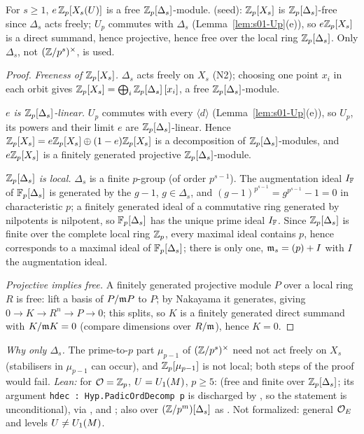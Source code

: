 \begin{proposition}\label{prop:s04-freeA}
For $s\ge1$, $e\,\mathbb{Z}_p[X_s(U)]$ is a free $\mathbb{Z}_p[\Delta_s]$-module. \stproved{} (seed): $\mathbb{Z}_p[X_s]$ is $\mathbb{Z}_p[\Delta_s]$-free since
$\Delta_s$ acts freely; $U_p$ commutes with $\Delta_s$ (Lemma~\ref{lem:s01-Up}(e)), so $e\mathbb{Z}_p[X_s]$ is a direct summand, hence
projective, hence free over the local ring $\mathbb{Z}_p[\Delta_s]$. Only $\Delta_s$, not $(\mathbb{Z}/p^s)^\times$, is used.
\end{proposition}
\begin{proof}
\emph{Freeness of $\mathbb{Z}_p[X_s]$.} $\Delta_s$ acts freely on $X_s$ (N2); choosing one point $x_i$ in each orbit gives
$\mathbb{Z}_p[X_s]=\bigoplus_i\mathbb{Z}_p[\Delta_s]\,[x_i]$, a free $\mathbb{Z}_p[\Delta_s]$-module.

\emph{$e$ is $\mathbb{Z}_p[\Delta_s]$-linear.} $U_p$ commutes with every $\langle d\rangle$ (Lemma~\ref{lem:s01-Up}(e)), so $U_p$, its powers
and their limit $e$ are $\mathbb{Z}_p[\Delta_s]$-linear. Hence $\mathbb{Z}_p[X_s]=e\mathbb{Z}_p[X_s]\oplus(1-e)\mathbb{Z}_p[X_s]$ is a decomposition of
$\mathbb{Z}_p[\Delta_s]$-modules, and $e\mathbb{Z}_p[X_s]$ is a finitely generated projective $\mathbb{Z}_p[\Delta_s]$-module.

\emph{$\mathbb{Z}_p[\Delta_s]$ is local.} $\Delta_s$ is a finite $p$-group (of order $p^{s-1}$). The augmentation ideal $I_{\mathbb{F}}$ of $\mathbb{F}_p[\Delta_s]$
is generated by the $g-1$, $g\in\Delta_s$, and $(g-1)^{p^{s-1}}=g^{p^{s-1}}-1=0$ in characteristic $p$; a finitely generated ideal of a
commutative ring generated by nilpotents is nilpotent, so $\mathbb{F}_p[\Delta_s]$ has the unique prime ideal $I_{\mathbb{F}}$. Since $\mathbb{Z}_p[\Delta_s]$
is finite over the complete local ring $\mathbb{Z}_p$, every maximal ideal contains $p$, hence corresponds to a maximal ideal of
$\mathbb{F}_p[\Delta_s]$; there is only one, $\mathfrak{m}_s=(p)+I$ with $I$ the augmentation ideal.

\emph{Projective implies free.} A finitely generated projective module $P$ over a local ring $R$ is free: lift a basis of
$P/\mathfrak{m} P$ to $P$; by Nakayama it generates, giving $0\to K\to R^n\to P\to0$; this splits, so $K$ is a finitely generated direct summand
with $K/\mathfrak{m} K=0$ (compare dimensions over $R/\mathfrak{m}$), hence $K=0$.
\end{proof}
\noindent\emph{Why only $\Delta_s$.} The prime-to-$p$ part $\mu_{p-1}$ of $(\mathbb{Z}/p^s)^\times$ need not act freely on $X_s$ (stabilisers in
$\mu_{p-1}$ can occur), and $\mathbb{Z}_p[\mu_{p-1}]$ is not local; both steps of the proof would fail.
\emph{Lean:} \stformal{} for $\mathcal{O}=\mathbb{Z}_p$, $U=U_1(M)$, $p\ge5$:  (free and finite over $\mathbb{Z}_p[\Delta_s]$; its argument
\texttt{hdec : Hyp.PadicOrdDecomp p} is discharged by , so the statement is unconditional), via
,  and
; also over $(\mathbb{Z}/p^m)[\Delta_s]$ as . Not formalized:
general $\mathcal{O}_E$ and levels $U\ne U_1(M)$.


